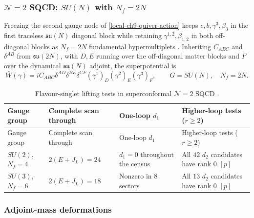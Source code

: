 \documentclass[11pt]{article}
\numberwithin{equation}{section}
\numberwithin{figure}{section}
\numberwithin{table}{section}
\begin{document}
\subsubsection{$\mathcal N=2$ SQCD: $SU(N)$ with $N_f=2N$}\label{sec-results-SQCD}

Freezing the second gauge node of \eqref{local-ch9-quiver-action} keeps $c,b,\gamma^3,\beta_3$ in the first traceless $\mathfrak{su}(N)$ diagonal block while retaining $\gamma^{1,2},\beta_{1,2}$ in both off-diagonal blocks as $N_f=2N$ fundamental hypermultiplets \cite[results report, \S4.1]{Repo}. Inheriting $C_{ABC}$ and $\delta^{AB}$ from $\mathfrak{su}(2N)$, with $D,E$ running over the off-diagonal matter blocks and $F$ over the dynamical $\mathfrak{su}(N)$ adjoint, the superpotential is
\begin{equation}\label{local-ch9-sqcd-action}
\bar W(\gamma)=iC_{ABC}\delta^{AD}\delta^{BE}\delta^{CF}
(\gamma^1)_D(\gamma^2)_E(\gamma^3)_F,
\qquad G=SU(N),\quad N_f=2N.
\end{equation}

{\footnotesize\renewcommand{\arraystretch}{1.26}\setlength{\tabcolsep}{3.5pt}
\begin{xltabular}{\linewidth}{|l|>{\raggedright\arraybackslash}p{2.6cm}|>{\raggedright\arraybackslash}X|>{\raggedright\arraybackslash}X|}
\caption{Flavour-singlet lifting tests in superconformal $\mathcal N=2$ SQCD \cite[supplement, Section S7.1]{Repo}.}\label{local-ch9-sqcd-results}\\
\hline
Gauge group & Complete scan through & One-loop $d_1$ & Higher-loop tests ($r\ge2$)\\
\hline\endfirsthead
\hline
Gauge group & Complete scan through & One-loop $d_1$ & Higher-loop tests ($r\ge2$)\\
\hline\endhead
$SU(2)$, $N_f=4$ & $2(E+J_L)=24$ & $d_1=0$ throughout the census & All $42$ $d_2$ candidates have rank $0$ $[p]$\\
\hline
$SU(3)$, $N_f=6$ & $2(E+J_L)=18$ & Nonzero in $8$ sectors & All $13$ $d_2$ candidates have rank $0$ $[p]$\\
\hline
\end{xltabular}}

\subsubsection{Adjoint-mass deformations}\label{sec-results-masses}
\end{document}
